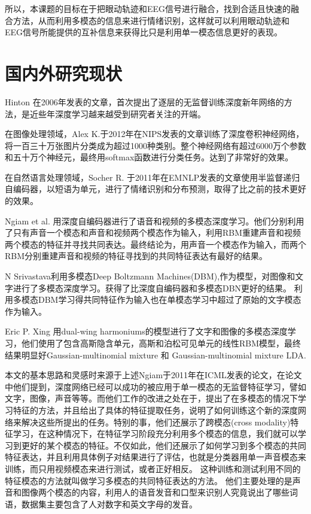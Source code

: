 	所以，本课题的目标在于把眼动轨迹和EEG信号进行融合，找到合适且快速的融合方法，从而利用多模态的信息来进行情绪识别，这样就可以利用眼动轨迹和EEG信号所能提供的互补信息来获得比只是利用单一模态信息更好的表现。
	
\section{国内外研究现状}

	Hinton 在2006年发表的文章，首次提出了逐层的无监督训练深度新年网络的方法，是近些年深度学习越来越受到研究者关注的开端。
	
	在图像处理领域，Alex K.于2012年在NIPS发表的文章训练了深度卷积神经网络，将一百三十万张图片分类成为超过1000种类别。整个神经网络有超过6000万个参数和五十万个神经元，最终用softmax函数进行分类任务。达到了非常好的效果。
	
	在自然语言处理领域，Socher R. 于2011年在EMNLP发表的文章使用半监督递归自编码器，以短语为单元，进行了情绪识别和分布预测，取得了比之前的技术更好的效果。
	
	Ngiam et al. 用深度自编码器进行了语音和视频的多模态深度学习。他们分别利用了只有声音一个模态和声音和视频两个模态作为输入，利用RBM重建声音和视频两个模态的特征并寻找共同表达。最终结论为，用声音一个模态作为输入，而两个RBM分别重建声音和视频的特征寻找到的共同特征表达有最好的结果。
	
	 N Srivastava利用多模态Deep Boltzmann Machines(DBM),作为模型，对图像和文字进行了多模态深度学习。获得了比深度自编码器和多模态DBN更好的结果。 利用多模态DBM学习得共同特征作为输入也在单模态学习中超过了原始的文字模态作为输入。
	 
	Eric P. Xing 用dual-wing harmoniums的模型进行了文字和图像的多模态深度学习，他们使用了包含高斯隐含单元，高斯和泊松可见单元的线性RBM模型，最终结果明显好Gaussian-multinomial mixture 和 Gaussian-multinomial mixture LDA.
	
		本文的基本思路和灵感时来源于上述Ngiam于2011年在ICML发表的论文，在论文中他们提到，深度网络已经可以成功的被应用于单一模态的无监督特征学习，譬如文字，图像，声音等等。而他们工作的改进之处在于，提出了在多模态的情况下学习特征的方法，并且给出了具体的特征提取任务，说明了如何训练这个新的深度网络来解决这些所提出的任务。特别的事，他们还展示了跨模态(cross modality)特征学习，在这种情况下，在特征学习阶段充分利用多个模态的信息，我们就可以学习到更好的某个模态的特征。不仅如此，他们还展示了如何学习到多个模态的共同特征表达，并且利用具体例子对结果进行了评估，也就是分类器用单一声音模态来训练，而只用视频模态来进行测试，或者正好相反。 这种训练和测试利用不同的特征模态的方法就叫做学习多模态的共同特征表达的方法。 他们主要处理的是声音和图像两个模态的内容，利用人的语音发音和口型来识别人究竟说出了哪些词语，数据集主要包含了人对数字和英文字母的发音。
	 
